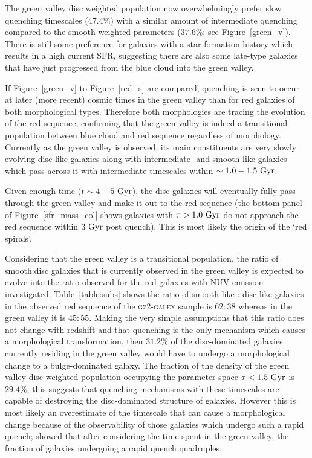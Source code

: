 The green valley disc weighted population now overwhelmingly prefer slow quenching timescales ($47.4\%$) with a similar amount of intermediate quenching compared to the smooth weighted parameters ($37.6\%$; see Figure~\ref{green_v}). There is still some preference for galaxies with a star formation history which results in a high current SFR, suggesting there are also some late-type galaxies that have just progressed from the blue cloud into the green valley. 

If Figure~\ref{green_v} to Figure~\ref{red_s} are compared, quenching is seen to occur at later (more recent) cosmic times in the green valley than for red galaxies of both morphological types. Therefore both morphologies are tracing the evolution of the red sequence, confirming that the green valley is indeed a transitional population between blue cloud and red sequence regardless of morphology. Currently as the green valley is observed, its main constituents are very slowly evolving disc-like galaxies along with intermediate- and smooth-like galaxies which pass across it with intermediate timescales within $\sim 1.0-1.5~\rm{Gyr}$.

Given enough time ($t\sim4 - 5~\rm{Gyr}$), the disc galaxies will eventually fully pass through the green valley and make it out to the red sequence (the bottom panel of Figure~\ref{sfr_mass_col} shows galaxies with $\tau > 1.0~\rm{Gyr}$ do not approach the red sequence within $3~\rm{Gyr}$ post quench). This is most likely the origin of the `red spirals'.

Considering that the green valley is a transitional population, the ratio of smooth:disc galaxies that is currently observed in the green valley is expected to evolve into the ratio observed for the red galaxies with NUV emission investigated. Table~\ref{table:subs} shows the ratio of smooth-like : disc-like galaxies in the observed red sequence of the \textsc{gz2-galex} sample is $62:38$ whereas in the green valley it is $45:55$. Making the very simple assumptions that this ratio does not change with redshift and that quenching is the only mechanism which causes a morphological transformation, then $31.2\%$ of the disc-dominated galaxies currently residing in the green valley would have to undergo a morphological change to a bulge-dominated galaxy. The fraction of the density of the green valley disc weighted population occupying the parameter space $\tau < 1.5 ~\rm{Gyr}$ is $29.4\%$, this suggests that quenching mechanisms with these timescales are capable of destroying the disc-dominated structure of galaxies. However this is most likely an overestimate of the timescale that can cause a morphological change because of the observability of those galaxies which undergo such a rapid quench; \citet[][and see Figure~\ref{fig:timing}]{Martin07} showed that after considering the time spent in the green valley, the fraction of galaxies undergoing a rapid quench quadruples.


